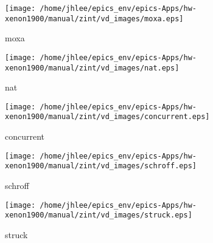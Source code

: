 \noindent
\vspace{1.4cm}
\begin{minipage}{.2\textwidth}
\begin{center}
\texttt{[image: /home/jhlee/epics\_env/epics-Apps/hw-xenon1900/manual/zint/vd\_images/moxa.eps]}
\end{center}
\end{minipage}
\begin{minipage}{.7\textwidth}
moxa
\end{minipage}


\noindent
\vspace{1.4cm}
\begin{minipage}{.2\textwidth}
\begin{center}
\texttt{[image: /home/jhlee/epics\_env/epics-Apps/hw-xenon1900/manual/zint/vd\_images/nat.eps]}
\end{center}
\end{minipage}
\begin{minipage}{.7\textwidth}
nat
\end{minipage}


\noindent
\vspace{1.4cm}
\begin{minipage}{.2\textwidth}
\begin{center}
\texttt{[image: /home/jhlee/epics\_env/epics-Apps/hw-xenon1900/manual/zint/vd\_images/concurrent.eps]}
\end{center}
\end{minipage}
\begin{minipage}{.7\textwidth}
concurrent
\end{minipage}


\noindent
\vspace{1.4cm}
\begin{minipage}{.2\textwidth}
\begin{center}
\texttt{[image: /home/jhlee/epics\_env/epics-Apps/hw-xenon1900/manual/zint/vd\_images/schroff.eps]}
\end{center}
\end{minipage}
\begin{minipage}{.7\textwidth}
schroff
\end{minipage}


\noindent
\vspace{1.4cm}
\begin{minipage}{.2\textwidth}
\begin{center}
\texttt{[image: /home/jhlee/epics\_env/epics-Apps/hw-xenon1900/manual/zint/vd\_images/struck.eps]}
\end{center}
\end{minipage}
\begin{minipage}{.7\textwidth}
struck
\end{minipage}


